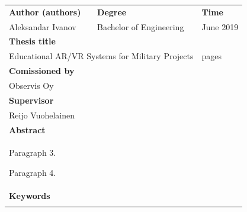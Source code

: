 \documentclass[12pt, a4paper,oneside, nocenter]{thesis}
\newcommand\blankpage{%
    \null
    \thispagestyle{empty}%
    \addtocounter{page}{-1}%
    \newpage}
\begin{document}
    \thispagestyle{empty}
		\noindent
		\newlength{\lengtha}
		\setlength{\lengtha}{.96\textwidth}
    \begin{tabularx}{\linewidth}{|XXXX|}
      \hline
	   \textbf{Author (authors)} &  \textbf{Degree} &  & \textbf{Time} \\
	   Aleksandar Ivanov &  \multicolumn{2}{l}{Bachelor of Engineering} & June 2019 \\
	   \hline
	   \textbf{Thesis title} & & & \\
	   \multicolumn{3}{|l}{Educational AR/VR Systems for Military Projects} & \pageref{LastPage} pages\\
	  \hline
		\textbf{Comissioned by} & & & \\
		Observis Oy & & & \\
	  \hline
	  \textbf{Supervisor} & & & \\
	  Reijo Vuohelainen & & & \\
	  \hline
		\textbf{Abstract} & & & \\
		\multicolumn{4}{|p{\lengtha}|}{\raggedright \setstretch{1.0}\lipsum[1-2] \par Paragraph 3.
		\par Paragraph 4.} \\
	  \hline
	  \textbf{Keywords} & & & \\
	  & & & \\
	  \hline
    \end{tabularx}

\newpage%
{
\tableofcontents
}

\newpage%



\end{document}

